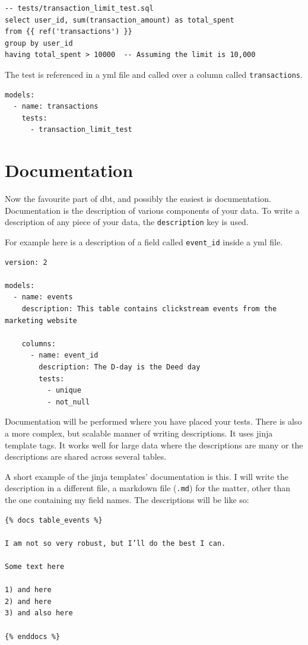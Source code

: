 \documentclass[
]{book}
\begin{document}
\begin{verbatim}
-- tests/transaction_limit_test.sql
select user_id, sum(transaction_amount) as total_spent
from {{ ref('transactions') }}
group by user_id
having total_spent > 10000  -- Assuming the limit is 10,000

\end{verbatim}

The test is referenced in a yml file and called over a column called \texttt{transactions}.

\begin{verbatim}
models:
  - name: transactions
    tests:
      - transaction_limit_test
\end{verbatim}

\hypertarget{documentation}{%
\section{Documentation}\label{documentation}}

Now the favourite part of dbt, and possibly the easiest is documentation. Documentation is the description of various components of your data. To write a description of any piece of your data, the \texttt{description} key is used.

For example here is a description of a field called \texttt{event\_id} inside a yml file.

\begin{verbatim}
version: 2

models:
  - name: events
    description: This table contains clickstream events from the marketing website

    columns:
      - name: event_id
        description: The D-day is the Deed day
        tests:
          - unique
          - not_null
\end{verbatim}

Documentation will be performed where you have placed your tests. There is also a more complex, but scalable manner of writing descriptions. It uses jinja template tags. It works well for large data where the descriptions are many or the descriptions are shared across several tables.

A short example of the jinja templates' documentation is this. I will write the description in a different file, a markdown file (\texttt{.md}) for the matter, other than the one containing my field names. The descriptions will be like so:

\begin{verbatim}
{% docs table_events %}

I am not so very robust, but I’ll do the best I can.

Some text here

1) and here
2) and here
3) and also here

{% enddocs %}
\end{verbatim}
\end{document}
